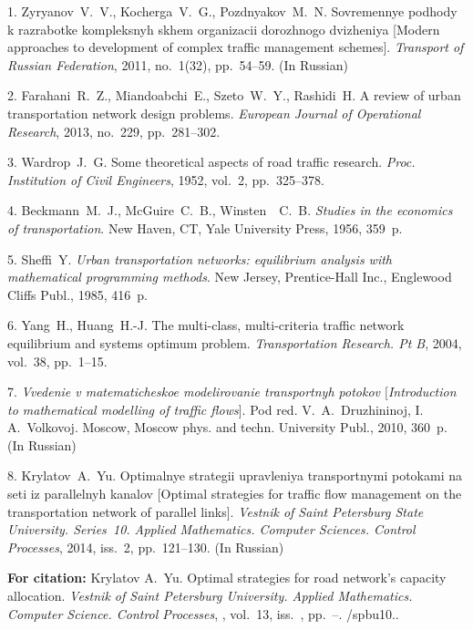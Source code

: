 {\footnotesize

\vskip 4mm


\vskip 3mm


1. Zyryanov~V.~V., Kocherga~V.~G., Pozdnyakov~M.~N. Sovremennye
podhody k razrabotke kompleksnyh skhem organizacii dorozhnogo
dvizheniya [Modern approaches to development of complex traffic
management schemes]. {\em Transport of Russian Federation}, 2011,
no.~1(32), pp.~54--59. (In Russian)

2. Farahani~R.~Z., Miandoabchi~E., Szeto~W.~Y., Rashidi~H. A
review of urban transportation network design problems. {\em
European Journal of Operational Research}, 2013, no.~229,
pp.~281--302.

3. Wardrop~J.~G. Some theoretical aspects of road traffic
research. {\em Proc. Institution of Civil Engineers}, 1952,
vol.~2, pp.~325--378.

4. Beckmann~M.~J., McGuire~C.~B., Winsten~~C.~B. {\em Studies in
the economics of transportation}. New Haven, CT, Yale University
Press, 1956, 359~p.

5. Sheffi~Y. {\em Urban transportation networks: equilibrium
analysis with mathematical programming methods}. New Jersey,
Prentice-Hall Inc., Englewood Cliffs Publ., 1985, 416~p.

6. Yang~H., Huang~H.-J. The multi-class, multi-criteria traffic
network equilibrium and systems optimum problem. {\em
Transportation Research. Pt B}, 2004, vol.~38, pp.~1--15.

7. {\em Vvedenie v matematicheskoe modelirovanie transportnyh
potokov $[$Introduction to mathematical modelling of traffic
flows}]. Pod red. V.~A.~Druzhininoj, I. A.~Volkovoj. Moscow,
Moscow phys. and techn. University Publ., 2010, 360~p. (In
Russian)

8. Krylatov~A.~Yu. Optimalnye strategii upravleniya transportnymi
potokami na seti iz parallelnyh kanalov [Optimal strategies for
traffic flow management on the transportation network of parallel
links]. {\em Vestnik of Saint Petersburg State University.
Series~10. Applied Mathematics. Computer Sciences. Control
Processes}, 2014, iss.~2, pp.~121--130. (In Russian)



\vskip 2mm

{\bf For citation:}  Krylatov A.~Yu. Optimal strategies for road
network's capacity allocation. {\it Vestnik of Saint Petersburg
University. Applied Mathematics. Computer Science. Control
Processes}, \issueyear, vol.~13, iss.~\issuenum,
pp.~\pageref{p5}--\pageref{p5e}.
\doivyp/spbu10.\issueyear.


}
